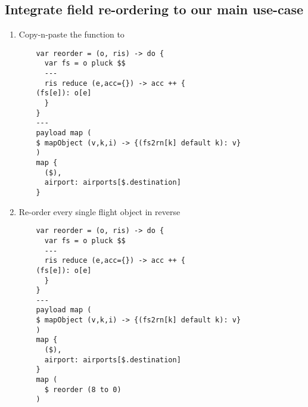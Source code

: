 \subsection{Integrate field re-ordering to our main use-case}
\begin{enumerate}[resume*]
\item Copy-n-paste the  function to 
  \begin{verbatim}
    var reorder = (o, ris) -> do {
      var fs = o pluck $$
      ---
      ris reduce (e,acc={}) -> acc ++ {
	(fs[e]): o[e] 
      }
    }
    ---
    payload map (
    $ mapObject (v,k,i) -> {(fs2rn[k] default k): v}
    )
    map {
      ($),
      airport: airports[$.destination]
    }
  \end{verbatim}
\item Re-order every single flight object in reverse
  \begin{verbatim}
    var reorder = (o, ris) -> do {
      var fs = o pluck $$
      ---
      ris reduce (e,acc={}) -> acc ++ {
	(fs[e]): o[e] 
      }
    }
    ---
    payload map (
    $ mapObject (v,k,i) -> {(fs2rn[k] default k): v}
    )
    map {
      ($),
      airport: airports[$.destination]
    }
    map (
      $ reorder (8 to 0)
    )
  \end{verbatim}
\end{enumerate}
